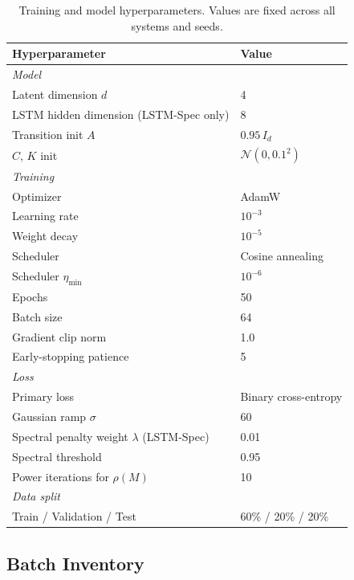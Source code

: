 \begin{table}[htbp]
  \centering
  \caption{Training and model hyperparameters. Values are fixed across all
  systems and seeds.}
  \label{tab:hyperparams}
  \small
  \begin{tabular}{ll}
    \toprule
    Hyperparameter & Value \\
    \midrule
    \multicolumn{2}{l}{\emph{Model}} \\[2pt]
    Latent dimension $d$ & 4 \\
    LSTM hidden dimension (LSTM-Spec only) & 8 \\
    Transition init $A$ & $0.95\,I_d$ \\
    $C$, $K$ init & $\mathcal{N}(0, 0.1^2)$ \\[4pt]
    \multicolumn{2}{l}{\emph{Training}} \\[2pt]
    Optimizer & AdamW \\
    Learning rate & $10^{-3}$ \\
    Weight decay & $10^{-5}$ \\
    Scheduler & Cosine annealing \\
    Scheduler $\eta_{\min}$ & $10^{-6}$ \\
    Epochs & 50 \\
    Batch size & 64 \\
    Gradient clip norm & 1.0 \\
    Early-stopping patience & 5 \\[4pt]
    \multicolumn{2}{l}{\emph{Loss}} \\[2pt]
    Primary loss & Binary cross-entropy \\
    Gaussian ramp $\sigma$ & 60 \\
    Spectral penalty weight $\lambda$ (LSTM-Spec) & 0.01 \\
    Spectral threshold & 0.95 \\
    Power iterations for $\rho(M)$ & 10 \\[4pt]
    \multicolumn{2}{l}{\emph{Data split}} \\[2pt]
    Train / Validation / Test & 60\% / 20\% / 20\% \\
    \bottomrule
  \end{tabular}
\end{table}

\subsection{Batch Inventory}
\label{sec:appendix:batches}


